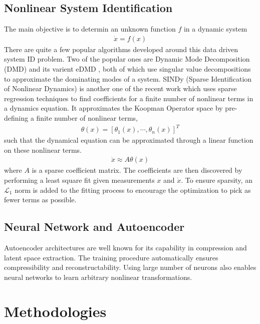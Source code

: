 \documentclass[12pt]{article}
\begin{document}
\subsection{Nonlinear System Identification}

The main objective is to determin an unknown function $f$ in a dynamic system
\begin{gather}
  \dot{x}= f(x)
\end{gather}
There are quite a few popular algorithms developed around
this data driven system ID problem.
Two of the popular ones are Dynamic Mode Decomposition (DMD) \cite{schmid2010dynamic} and
its varient eDMD \cite{williams2015data}, both of which use singular value decompositions to
approximate the dominating modes of a system. SINDy \cite{brunton2016discovering}
(Sparse Identification of Nonlinear Dynamics) is another one of the recent work which
uses sparse regression techniques to find coefficients for a finite number of nonlinear
terms in a dynamics equation. It approximates the Koopman Operator space by pre-defining
a finite number of nonlinear terms,
\begin{gather}
  \theta(x) = [\theta_1(x),\cdots,\theta_n(x)]^T
\end{gather}
such that the dynamical equation can be approximated through a linear function on
these nonlinear terms.
\begin{gather}
  \dot{x} \approx A \theta(x)
\end{gather}
where $A$ is a sparse coefficient matrix. The coefficients are then discovered
by performing a least square fit given measurements $x$ and $\dot{x}$. To ensure sparsity,
an $\mathcal{L}_1$ norm is added to the fitting process to encourage the optimization to
pick as fewer terms as possible.

\subsection{Neural Network and Autoencoder}

Autoencoder architectures are well known for its capability in compression
and latent space extraction. The training procedure automatically ensures
compressibility and reconstructability. Using large number of neurons also enables
neural networks to learn arbitrary nonlinear transformations.

\section{Methodologies}
\end{document}
